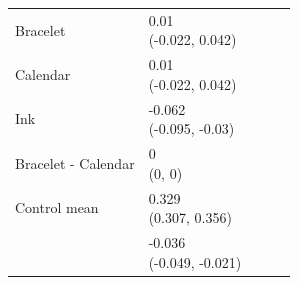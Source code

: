 {\begin{tabular}[t]{lllll}
\hspace{1em}Bracelet & \makecell[c]{0.01\\(-0.022, 0.042)} &  &  & \\
\hspace{1em}Calendar & \makecell[c]{0.01\\(-0.022, 0.042)} &  &  & \\
\midrule
\hspace{1em}Ink & \makecell[c]{-0.062\\(-0.095, -0.03)} &  &  & \\
\hspace{1em}Bracelet - Calendar & \makecell[c]{0\\(0, 0)} &  &  & \\
Control mean & \makecell[c]{0.329\\(0.307, 0.356)} &  &  & \\
 & \makecell[c]{-0.036\\(-0.049, -0.021)} &  &  & \\
\bottomrule
\end{tabular}}

